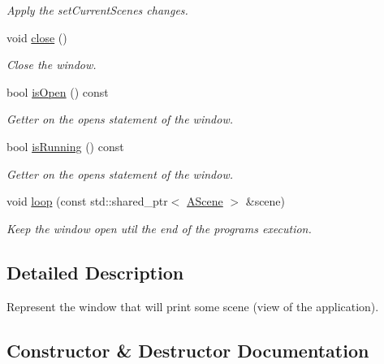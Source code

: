 \begin{DoxyCompactItemize}
\begin{DoxyCompactList}\small\item\em Apply the set\+Current\+Scene\textquotesingle{}s changes. \end{DoxyCompactList}\item 
\mbox{\label{classWindow_a35055c04498121d39741bfcd5082705b}} 
void \hyperlink{classWindow_a35055c04498121d39741bfcd5082705b}{close} ()
\begin{DoxyCompactList}\small\item\em Close the window. \end{DoxyCompactList}\item 
bool \hyperlink{classWindow_a761d614931fb5a5daa70e4f580c3e78e}{is\+Open} () const
\begin{DoxyCompactList}\small\item\em Getter on the open\textquotesingle{}s statement of the window. \end{DoxyCompactList}\item 
bool \hyperlink{classWindow_a53329abfc23df8a908ce7002c88dc244}{is\+Running} () const
\begin{DoxyCompactList}\small\item\em Getter on the open\textquotesingle{}s statement of the window. \end{DoxyCompactList}\item 
void \hyperlink{classWindow_a2b026b4d11c9a67b5103921de251cd46}{loop} (const std\+::shared\+\_\+ptr$<$ \hyperlink{classAScene}{A\+Scene} $>$ \&scene)
\begin{DoxyCompactList}\small\item\em Keep the window open util the end of the program\textquotesingle{}s execution. \end{DoxyCompactList}\end{DoxyCompactItemize}


\subsection{Detailed Description}
Represent the window that will print some scene (view of the application). 

\subsection{Constructor \& Destructor Documentation}
\mbox{\label{classWindow_a25fd6af55e81b781b132166f77daf77e}} 
